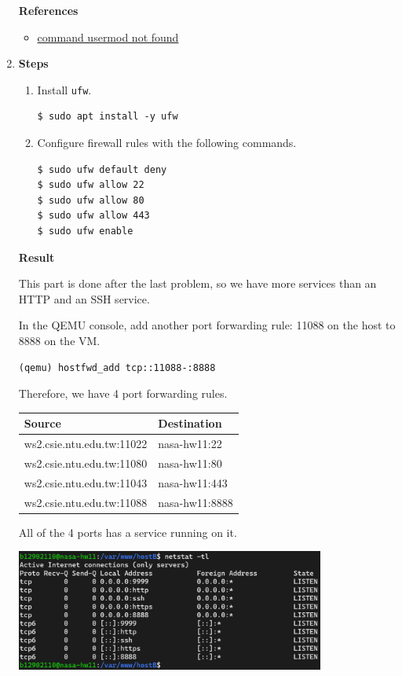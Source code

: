 \documentclass[12pt, a4paper]{article}
\begin{document}
\begin{enumerate}[resume]
    \textbf{References}
    \begin{itemize}
      \item \href{https://www.linuxquestions.org/questions/linux-newbie-8/command-usermod-not-found-385901/}{command usermod not found}
    \end{itemize}

    \item \textbf{Steps}
    \begin{enumerate}[label=(\arabic*)]
      \item Install \verb|ufw|.
      \begin{Verbatim}[frame=single]
$ sudo apt install -y ufw
      \end{Verbatim}
      \item Configure firewall rules with the following commands.
      \begin{Verbatim}[frame=single]
$ sudo ufw default deny
$ sudo ufw allow 22
$ sudo ufw allow 80
$ sudo ufw allow 443
$ sudo ufw enable
      \end{Verbatim}
    \end{enumerate}

    \textbf{Result}

    This part is done after the last problem, so we have more services than an HTTP
    and an SSH service.

    In the QEMU console, add another port forwarding rule: 11088 on the host to
    8888 on the VM.
    \begin{Verbatim}[frame=single]
(qemu) hostfwd_add tcp::11088-:8888
    \end{Verbatim}

    Therefore, we have 4 port forwarding rules.

    \begin{tabular}{|ll|}
      \hline
      \textbf{Source} & \textbf{Destination} \\\hline
      ws2.csie.ntu.edu.tw:11022 & nasa-hw11:22 \\
      ws2.csie.ntu.edu.tw:11080 & nasa-hw11:80 \\
      ws2.csie.ntu.edu.tw:11043 & nasa-hw11:443 \\
      ws2.csie.ntu.edu.tw:11088 & nasa-hw11:8888 \\
      \hline
    \end{tabular}

    All of the 4 ports has a service running on it.

    \includegraphics[width=0.8\textwidth]{7_netstat.png}


\end{enumerate}
\end{document}
